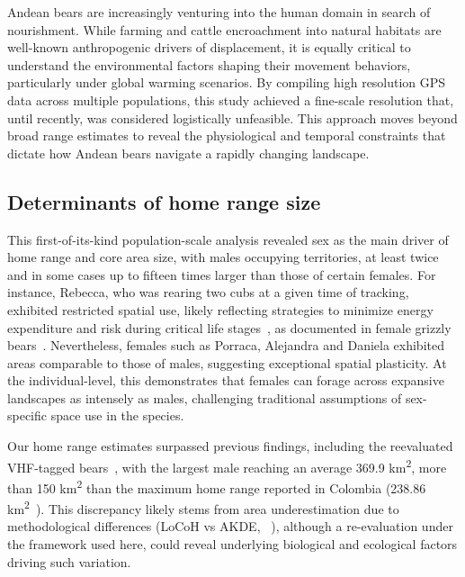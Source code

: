 \documentclass[lineno,referee,pdflatex,sn-vancouver-num]{sn-jnl}%
\theoremstyle{thmstyleone}%
\theoremstyle{thmstyletwo}%
\theoremstyle{thmstylethree}%
\begin{document}
Andean bears are increasingly venturing into the human domain in search of nourishment.
While farming and cattle encroachment into natural habitats are well-known
anthropogenic drivers of displacement, it is equally critical to understand the
environmental factors shaping their movement behaviors, particularly under global warming
scenarios. By compiling high resolution GPS data across multiple populations, this study
achieved a fine-scale resolution that, until recently, was considered logistically
unfeasible. This approach moves beyond broad range estimates to reveal the physiological
and temporal constraints that dictate how Andean bears navigate a rapidly changing
landscape.

\subsection{Determinants of home range size}

This first-of-its-kind population-scale
analysis revealed sex as the main driver of home range and core area size, with males
occupying territories, at least twice and in some cases up to fifteen times larger than
those of certain females. For instance, Rebecca, who was rearing two cubs at a given time of
tracking, exhibited restricted spatial use, likely reflecting strategies to minimize
energy expenditure and risk during critical life
stages~\cite{sechaudHomeRangeSize2022}, as documented in female grizzly
bears~\cite{dahleHomeRangesAdult2003,dahleSeasonalRangeSize2003}.
Nevertheless, females such as Porraca, Alejandra and Daniela exhibited areas comparable
to those of males, suggesting exceptional spatial plasticity. At the
individual-level, this demonstrates that females can forage across expansive
landscapes as intensely as males, challenging traditional assumptions of
sex-specific space use in the species.

Our home range estimates surpassed previous findings, including the reevaluated
VHF-tagged bears~\cite{castellanosAndeanBearHome2011}, with the largest male
reaching an average 369.9 km\textsuperscript{2}, more than 150 km\textsuperscript{2}
than the maximum home range reported in Colombia
(238.86 km\textsuperscript{2}~\cite{rodriguezSpaceUseMale2021}). This discrepancy likely
stems from area underestimation due to methodological differences (LoCoH vs AKDE,
~\cite{silvaAutocorrelationinformedHomeRange2022}), although a re-evaluation
under the framework used here, could reveal underlying biological and ecological factors
driving such variation.
\end{document}
